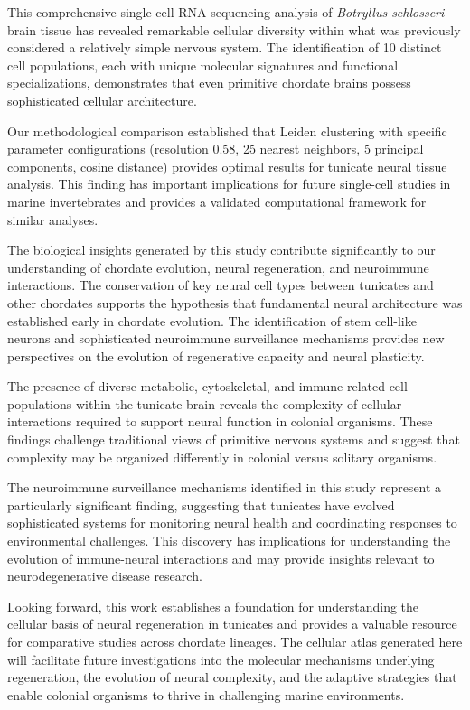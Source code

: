 \documentclass[12pt,a4paper]{article}
\begin{document}
This comprehensive single-cell RNA sequencing analysis of \textit{Botryllus schlosseri} brain tissue has revealed remarkable cellular diversity within what was previously considered a relatively simple nervous system. The identification of 10 distinct cell populations, each with unique molecular signatures and functional specializations, demonstrates that even primitive chordate brains possess sophisticated cellular architecture.

Our methodological comparison established that Leiden clustering with specific parameter configurations (resolution 0.58, 25 nearest neighbors, 5 principal components, cosine distance) provides optimal results for tunicate neural tissue analysis. This finding has important implications for future single-cell studies in marine invertebrates and provides a validated computational framework for similar analyses.

The biological insights generated by this study contribute significantly to our understanding of chordate evolution, neural regeneration, and neuroimmune interactions. The conservation of key neural cell types between tunicates and other chordates supports the hypothesis that fundamental neural architecture was established early in chordate evolution. The identification of stem cell-like neurons and sophisticated neuroimmune surveillance mechanisms provides new perspectives on the evolution of regenerative capacity and neural plasticity.

The presence of diverse metabolic, cytoskeletal, and immune-related cell populations within the tunicate brain reveals the complexity of cellular interactions required to support neural function in colonial organisms. These findings challenge traditional views of primitive nervous systems and suggest that complexity may be organized differently in colonial versus solitary organisms.

The neuroimmune surveillance mechanisms identified in this study represent a particularly significant finding, suggesting that tunicates have evolved sophisticated systems for monitoring neural health and coordinating responses to environmental challenges. This discovery has implications for understanding the evolution of immune-neural interactions and may provide insights relevant to neurodegenerative disease research.

Looking forward, this work establishes a foundation for understanding the cellular basis of neural regeneration in tunicates and provides a valuable resource for comparative studies across chordate lineages. The cellular atlas generated here will facilitate future investigations into the molecular mechanisms underlying regeneration, the evolution of neural complexity, and the adaptive strategies that enable colonial organisms to thrive in challenging marine environments.
\end{document}

